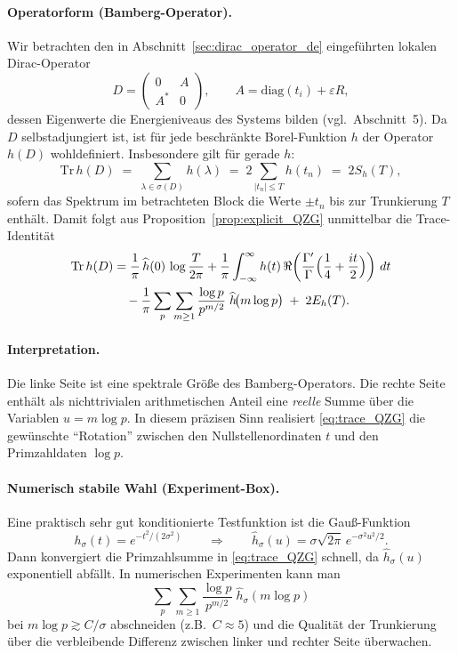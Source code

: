 \documentclass[11pt,twocolumn,a4paper]{article}
\theoremstyle{definition}
\begin{document}
\paragraph{Operatorform (Bamberg-Operator).}
Wir betrachten den in Abschnitt~\ref{sec:dirac_operator_de} eingeführten lokalen Dirac-Operator
\[
D=\begin{pmatrix}0&A\\A^\ast&0\end{pmatrix},
\qquad
A=\mathrm{diag}(t_i)+\varepsilon R,
\]
dessen Eigenwerte die Energieniveaus des Systems bilden (vgl.\ Abschnitt~5). Da $D$ selbstadjungiert ist,
ist für jede beschränkte Borel-Funktion $h$ der Operator $h(D)$ wohldefiniert.
Insbesondere gilt für gerade $h$:
\[
\mathrm{Tr}\,h(D)\;=\;\sum_{\lambda\in\sigma(D)} h(\lambda)\;=\;2\sum_{|t_n|\le T} h(t_n)\;=\;2S_h(T),
\]
sofern das Spektrum im betrachteten Block die Werte $\pm t_n$ bis zur Trunkierung $T$ enthält.
Damit folgt aus Proposition~\ref{prop:explicit_QZG} unmittelbar die Trace-Identität
\begin{align}
\mathrm{Tr}\,h(D)
&=\frac{1}{\pi}\,\widehat h(0)\,\log\frac{T}{2\pi}
+\frac{1}{\pi}\int_{-\infty}^{\infty} h(t)\,
\Re\!\left(\frac{\Gamma'}{\Gamma}\Bigl(\frac14+\frac{it}{2}\Bigr)\right)\,dt \notag\\
&\quad-\frac{1}{\pi}\sum_{p}\sum_{m\ge 1}\frac{\log p}{p^{m/2}}\;\widehat h\!\bigl(m\log p\bigr)
\;+\;2E_h(T).
\label{eq:trace_QZG}
\end{align}

\paragraph{Interpretation.}
Die linke Seite ist eine spektrale Größe des Bamberg-Operators.
Die rechte Seite enthält als nichttrivialen arithmetischen Anteil eine \emph{reelle} Summe
über die Variablen $u=m\log p$. In diesem präzisen Sinn realisiert \eqref{eq:trace_QZG}
die gewünschte ``Rotation'' zwischen den Nullstellenordinaten $t$ und den Primzahldaten $\log p$.

\paragraph{Numerisch stabile Wahl (Experiment-Box).}
Eine praktisch sehr gut konditionierte Testfunktion ist die Gauß-Funktion
\[
h_\sigma(t)=e^{-t^2/(2\sigma^2)}
\qquad\Longrightarrow\qquad
\widehat h_\sigma(u)=\sigma\sqrt{2\pi}\,e^{-\sigma^2u^2/2}.
\]
Dann konvergiert die Primzahlsumme in \eqref{eq:trace_QZG} schnell,
da $\widehat h_\sigma(u)$ exponentiell abfällt. In numerischen Experimenten kann man
\[
\sum_{p}\sum_{m\ge 1}\frac{\log p}{p^{m/2}}\;\widehat h_\sigma(m\log p)
\]
bei $m\log p \gtrsim C/\sigma$ abschneiden (z.B.\ $C\approx 5$) und die Qualität der Trunkierung
über die verbleibende Differenz zwischen linker und rechter Seite überwachen.
\end{document}
